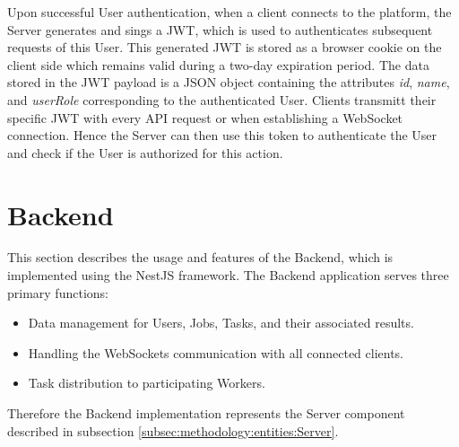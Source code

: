 Upon successful User authentication, when a client connects to the platform, the Server generates and sings a \ac{JWT}, which is used to authenticates subsequent requests of this User. This generated \ac{JWT} is stored as a browser cookie on the client side which remains valid during a two-day expiration period. The data stored in the \ac{JWT} payload is a \acs{JSON} object containing the attributes \emph{id}, \emph{name}, and \emph{userRole} corresponding to the authenticated User. Clients transmitt their specific \ac{JWT} with every \ac{API} request or when establishing a WebSocket connection. Hence the Server can then use this token to authenticate the User and check if the User is authorized for this action.

\section{Backend}
\label{sec:implementation:backend}
This section describes the usage and features of the Backend, which is implemented using the NestJS framework. The Backend application serves three primary functions: 
\begin{itemize}
    \item Data management for Users, Jobs, Tasks, and their associated results.
    \item Handling the WebSockets communication with all connected clients.
    \item Task distribution to participating Workers.
\end{itemize}
Therefore the Backend implementation represents the Server component described in subsection \ref{subsec:methodology:entities:Server}.

